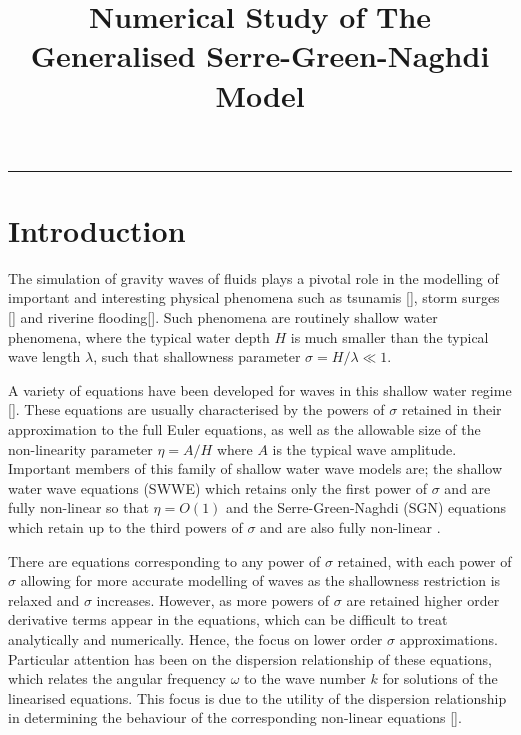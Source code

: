 \documentclass[10pt]{elsarticle}
\title{Numerical Study of The Generalised Serre-Green-Naghdi Model}
\begin{document}
\maketitle

\vspace{-0.3in}
\noindent
\rule{\linewidth}{0.4pt}

\tableofcontents

\section{Introduction}
The simulation of gravity waves of fluids plays a pivotal role in the modelling of important and interesting physical phenomena such as tsunamis [], storm surges [] and riverine flooding[]. Such phenomena are routinely shallow water phenomena, where the typical water depth $H$ is much smaller than the typical wave length $\lambda$, such that shallowness parameter $\sigma = H/  \lambda \ll 1$. 

A variety of equations have been developed for waves in this shallow water regime []. These equations are usually characterised by the powers of $\sigma$ retained in their approximation to the full Euler equations, as well as the allowable size of the non-linearity parameter $\eta = A/H$ where $A$ is the typical wave amplitude. Important members of this family of shallow water wave models are; the shallow water wave equations (SWWE) which retains only the first power of $\sigma$ \cite{Bonneton-Lannes-2009-16601} and are fully non-linear so that $\eta  = O\left(1\right)$ and the Serre-Green-Naghdi (SGN) equations which retain up to the third powers of $\sigma$ and are also fully non-linear \cite{Bonneton-Lannes-2009-16601}. 

There are equations corresponding to any power of $\sigma$ retained, with each power of $\sigma$ allowing for more accurate modelling of waves as the shallowness restriction is relaxed and $\sigma$ increases. However, as more powers of $\sigma$ are retained higher order derivative terms appear in the equations, which can be difficult to treat analytically and numerically. Hence, the focus on lower order $\sigma$ approximations. Particular attention has been on the dispersion relationship of these equations, which relates the angular frequency $\omega$ to the wave number $k$ for solutions of the linearised equations. This focus is due to the utility of the dispersion relationship in determining the behaviour of the corresponding non-linear equations []. 
\end{document}
